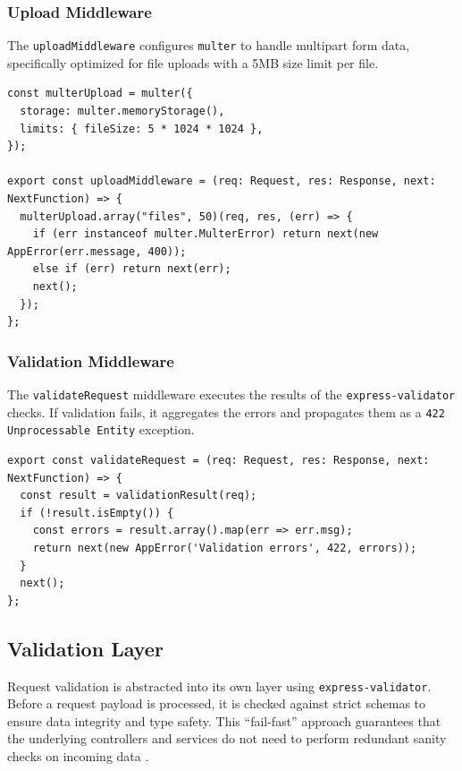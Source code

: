 \subsubsection{Upload Middleware}
The \texttt{uploadMiddleware} configures \texttt{multer} to handle multipart form data, specifically optimized for file uploads with a 5MB size limit per file.

\begin{lstlisting}
const multerUpload = multer({
  storage: multer.memoryStorage(),
  limits: { fileSize: 5 * 1024 * 1024 },
});

export const uploadMiddleware = (req: Request, res: Response, next: NextFunction) => {
  multerUpload.array("files", 50)(req, res, (err) => {
    if (err instanceof multer.MulterError) return next(new AppError(err.message, 400));
    else if (err) return next(err);
    next();
  });
};
\end{lstlisting}

\subsubsection{Validation Middleware}
The \texttt{validateRequest} middleware executes the results of the \texttt{express-validator} checks. If validation fails, it aggregates the errors and propagates them as a \texttt{422 Unprocessable Entity} exception.

\begin{lstlisting}
export const validateRequest = (req: Request, res: Response, next: NextFunction) => {
  const result = validationResult(req);
  if (!result.isEmpty()) {
    const errors = result.array().map(err => err.msg);
    return next(new AppError('Validation errors', 422, errors));
  }
  next();
};
\end{lstlisting}

\subsection{Validation Layer}

Request validation is abstracted into its own layer using \texttt{express-validator}. Before a request payload is processed, it is checked against strict schemas to ensure data integrity and type safety. This ``fail-fast'' approach guarantees that the underlying controllers and services do not need to perform redundant sanity checks on incoming data .

